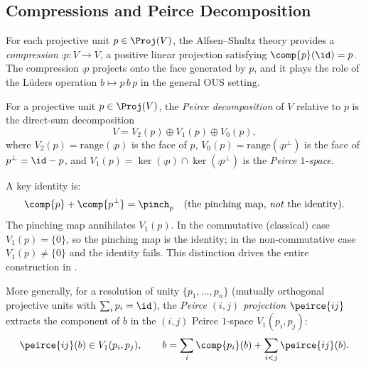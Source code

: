 \documentclass[11pt]{article}
\begin{document}
\label{ass:finite}%


\subsection{Compressions and Peirce Decomposition}
\label{sec:compressions}

For each projective unit $p \in \Proj(V)$, the Alfsen--Shultz theory
provides a \emph{compression} $\comp{p} : V \to V$, a positive linear
projection satisfying $\comp{p}(\id) = p$.  The compression $\comp{p}$
projects onto the face generated by $p$, and it plays the role of the
L\"uders operation $b \mapsto p\, b\, p$ in the general OUS setting.

\begin{definition}\label{def:peirce}
  For a projective unit $p \in \Proj(V)$, the \emph{Peirce
  decomposition} of $V$ relative to $p$ is the direct-sum
  decomposition
  \begin{equation}\label{eq:peirce}
    V = V_{2}(p) \oplus V_{1}(p) \oplus V_{0}(p),
  \end{equation}
  where $V_{2}(p) = \mathrm{range}(\comp{p})$ is the face of $p$,
  $V_{0}(p) = \mathrm{range}(\comp{p^{\perp}})$ is the face of
  $p^{\perp} = \id - p$, and
  $V_{1}(p) = \ker(\comp{p}) \cap \ker(\comp{p^{\perp}})$ is the
  \emph{Peirce $1$-space}.
\end{definition}

A key identity is:
\begin{equation}\label{eq:pinching}
  \comp{p} + \comp{p^{\perp}} = \pinch_{p}
  \quad (\text{the pinching map, \emph{not} the identity}).
\end{equation}
The pinching map annihilates $V_{1}(p)$.  In the commutative
(classical) case $V_{1}(p) = \{0\}$, so the pinching map is the
identity; in the non-commutative case $V_{1}(p) \neq \{0\}$ and the
identity fails.  This distinction drives the entire construction in
.

More generally, for a resolution of unity
$\{p_{1}, \ldots, p_{n}\}$ (mutually orthogonal projective units with
$\sum_{i} p_{i} = \id$), the \emph{Peirce $(i,j)$ projection}
$\peirce{ij}$ extracts the component of $b$ in the $(i,j)$ Peirce
$1$-space $V_{1}(p_{i}, p_{j})$:
\begin{equation}\label{eq:peirce-proj}
  \peirce{ij}(b) \in V_{1}(p_{i}, p_{j}),
  \qquad
  b = \sum_{i} \comp{p_{i}}(b) + \sum_{i < j} \peirce{ij}(b).
\end{equation}
\end{document}
